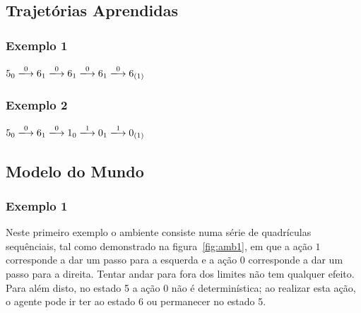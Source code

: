 \documentclass[a4paper,twocolumn]{article}
\begin{document}
    \subsection{Trajetórias Aprendidas}
    \subsubsection{Exemplo 1}
    $ 5_0 \xlongrightarrow{0} 6_1 \xlongrightarrow{0} 6_1 \xlongrightarrow{0} 6_1 \xlongrightarrow{0} 6_{(1)} $

    \subsubsection{Exemplo 2}
    $ 5_0 \xlongrightarrow{0} 6_1 \xlongrightarrow{0} 1_0 \xlongrightarrow{1} 0_1 \xlongrightarrow{1} 0_{(1)} $


    \subsection{Modelo do Mundo}
    \subsubsection{Exemplo 1}
    Neste primeiro exemplo o ambiente consiste numa série de quadrículas sequênciais, tal como demonstrado na
    figura~\ref{fig:amb1}, em que a ação $1$ corresponde a dar um passo para a esquerda e a ação $0$ corresponde a
    dar um passo para a direita. Tentar andar para fora dos limites não tem qualquer efeito.
    Para além disto, no estado 5 a ação 0 não é determinística; ao realizar esta ação, o agente pode ir ter ao estado
    6 ou permanecer no estado 5.
\end{document}
